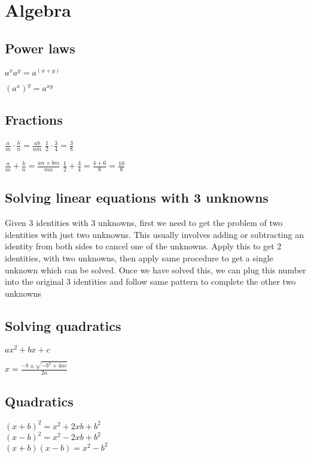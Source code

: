 \documentclass{article}
\begin{document}
	\section{Algebra}
	
	\subsection{Power laws}
	
	$ a^xa^y = a^{(x+y)}$

	$(a^x)^y = a^{xy}$	
	
	
	\subsection{Fractions}
	
	$ \frac{a}{m} \cdot \frac{b}{n}  = \frac{ab}{nm}$
	$ \frac{1}{2} \cdot \frac{3}{4} = \frac{3}{8} $
	
	$\frac{a}{m} + \frac{b}{n}  = \frac{an + bm}{mn} $
	$\frac{1}{2} + \frac{3}{4} = \frac{4 + 6}{8} = \frac{10}{8} $
	
	\subsection{Solving linear equations with 3 unknowns}
	
	Given 3 identities with 3 unknowns, first we need to get the problem of two identities with just two unknowns.
	This usually involves adding or subtracting an identity from both sides to cancel one of the unknowns.
	Apply this to get 2 identities, with two unknowns, then apply same procedure to get a single unknown which can be solved.
	Once we have solved this, we can plug this number into the original 3 identities and follow same pattern to complete the other two unknowns
	
		
	\subsection{Solving quadratics}
	$ax^2 + bx + c$
	
	$x = \frac{-b \pm \sqrt{-b^2 + 4ac}}{2a} $
	
	\subsection{Quadratics}
	
	$(x + b)^2 = x^2 + 2xb + b^2 $ \\
	$(x - b)^2 = x^2 - 2xb + b^2 $ \\
	$(x+b)(x-b) = x^2 - b^2 $
	
	
	
	
	
\end{document}
